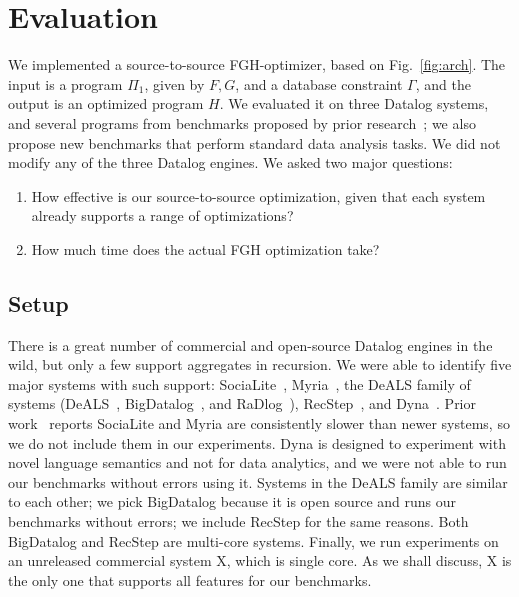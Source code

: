     \section{Evaluation}\label{sec:eval}
    
    We implemented a source-to-source FGH-optimizer, based on
    Fig.~\ref{fig:arch}.  The input is a program $\Pi_1$, given by $F, G$,
    and a database constraint $\Gamma$, and the output is an optimized
    program $H$.  We evaluated it on three Datalog systems, and several
    programs from benchmarks proposed by prior
    research~\cite{BigDatalog, DBLP:journals/pvldb/FanZZAKP19}; we also
    propose new benchmarks that perform standard data analysis tasks.  We
    did not modify any of the three Datalog engines.  We asked two major
    questions:
    \begin{enumerate}
    \item How effective is our source-to-source optimization, given that
      each system already supports a range of optimizations?
    \item How much time does the actual FGH optimization take?
    \end{enumerate}
    
    \subsection{Setup}
    
    
    There is a great number of commercial and open-source Datalog engines in the
    wild, but only a few support aggregates in recursion.
    We were able to identify five major systems with such support:
    SociaLite~\cite{DBLP:journals/tkde/SeoGL15},
    Myria~\cite{10.14778/2824032.2824052}, the DeALS family of systems
    (DeALS~\cite{DBLP:conf/icde/ShkapskyYZ15},
    BigDatalog~\cite{DBLP:conf/sigmod/ShkapskyYICCZ16}, and
    RaDlog~\cite{DBLP:conf/sigmod/0001WMSYDZ19}),
    RecStep~\cite{DBLP:journals/pvldb/FanZZAKP19}, and
    Dyna~\cite{francislandau-vieira-eisner-2020-wrla}.
    Prior work~\cite{BigDatalog} reports SociaLite and Myria are consistently slower than
    newer systems, so we do not include them in our experiments.
    Dyna is designed to experiment with novel language semantics and
    not for data analytics, and we were not able to run our benchmarks
    without errors using it.
    Systems in the DeALS family are similar to each other;
    we pick BigDatalog because it is open source
    and runs our benchmarks without errors;
    we include RecStep for the same reasons.
    Both BigDatalog and RecStep are multi-core systems.
    Finally, we run experiments on an unreleased commercial system X,
    which is single core.
    As we shall discuss, X is the only one that supports all features for
    our benchmarks.
    
